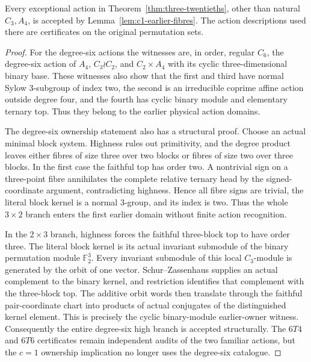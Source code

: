 \begin{lemma}\label{lem:c1-actual-membership}
Every exceptional action in Theorem~\ref{thm:three-twentieths}, other
than natural $C_3,A_4$, is accepted by
Lemma~\ref{lem:c1-earlier-fibres}. The action descriptions used there
are certificates on the original permutation sets.
\end{lemma}
\begin{proof}
For the degree-six actions the witnesses are, in order, regular $C_6$,
the degree-six action of $A_4$, $C_3\wr C_2$, and $C_2\times A_4$
with its cyclic three-dimensional binary base. These witnesses also
show that the first and third have normal Sylow $3$-subgroup of index
two, the second is an irreducible coprime affine action outside
degree four, and the fourth has cyclic binary module and elementary
ternary top. Thus they belong to the earlier physical action domains.

The degree-six ownership statement also has a structural proof.  Choose
an actual minimal block system.  Highness
rules out primitivity, and the degree product leaves either fibres of
size three over two blocks or fibres of size two over three blocks.  In
the first case the faithful top has order two.  A nontrivial sign on a
three-point fibre annihilates the complete relative ternary head by the
signed-coordinate argument, contradicting highness.  Hence all fibre
signs are trivial, the literal block kernel is a normal $3$-group, and
its index is two.  Thus the whole $3\times2$ branch enters the first
earlier domain without finite action recognition.

In the $2\times3$ branch, highness forces the faithful three-block top
to have order three.  The literal block kernel is its actual invariant
submodule of the binary permutation module $\mathbb F_2^3$.  Every
invariant submodule of this local $C_3$-module is generated by the orbit
of one vector.  Schur--Zassenhaus supplies an actual complement to the
binary kernel, and restriction identifies that complement with the
three-block top.  The additive orbit words then translate through the
faithful pair-coordinate chart into products of actual conjugates of
the distinguished kernel element.  This is precisely the cyclic
binary-module earlier-owner witness.  Consequently the entire
degree-six high branch is accepted structurally.  The $6T4$ and $6T6$
certificates remain independent audits of the two familiar actions,
but the $c=1$ ownership implication no longer uses the degree-six
catalogue.


\end{proof}
